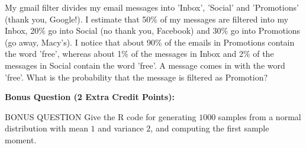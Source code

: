 \documentclass{article}
\begin{document}
\begin{problem}{20}
My gmail filter divides my email messages into 'Inbox', 'Social' and 'Promotions' (thank you, Google!). I estimate that 50\% of my messages are filtered into my Inbox, 20\% go into Social (no thank you, Facebook) and 30\% go into Promotions (go away, Macy's). I notice that about 90\% of the emails in Promotions contain the word 'free', whereas about 1\% of the messages in Inbox and 2\% of the messages in Social contain the word 'free'. A message comes in with the word 'free'. What is the probability that the message is filtered as Promotion?    
\vspace{1pc}
\end{problem}


{\large \bf Bonus Question (2 Extra Credit Points):}
\vspace{1pc}

BONUS QUESTION  
\vspace{1pc}
Give the R code for generating $1000$ samples from a normal distribution with mean $1$ and variance $2$, and computing the first sample moment.
\showpoints
\end{document}
